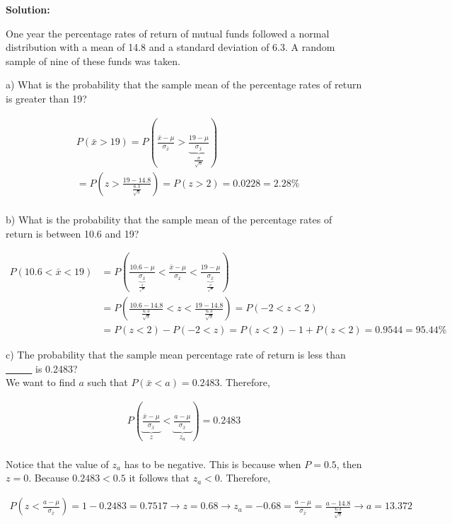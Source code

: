 \documentclass[12pt]{article}
\begin{document}
\begin{enumerate}
{\color{blue}
\noindent \textbf{Solution:}

One year the percentage rates of return of mutual funds followed a normal distribution with a mean of 14.8 and a standard deviation of 6.3. A random sample of nine of these funds was taken.

a) What is the probability that the sample mean of the percentage rates of return is greater than 19?

$$
\begin{aligned}
	& P(\bar{x}>19)=P(\frac{\bar{x}-\mu}{\sigma_{\bar{x}}}>\underbrace{\frac{19-\mu}{\sigma_{\bar{x}}}}_{\frac{\sigma}{\sqrt{n}}}) \\
	& =P\left(z>\frac{19-14.8}{\frac{6.3}{\sqrt{9}}}\right)=P(z>2)=0.0228=2.28 \% \\
	&
\end{aligned}
$$

	
b) What is the probability that the sample mean of the percentage rates of return is between 10.6 and 19?

$$
\begin{aligned}
	P(10.6<\bar{x}<19) & =P\left(\frac{10.6-\mu}{\underbrace{\sigma_{\bar{x}}}_{\frac{\sigma}{\sqrt{n}}}}<\frac{\bar{x}-\mu}{\sigma_{\bar{x}}}<\frac{19-\mu}{\underbrace{\sigma_{\bar{x}}}_{\frac{\sigma}{\sqrt{n}}}}\right) \\
	& =P\left(\frac{10.6-14.8}{\frac{6.3}{\sqrt{9}}}<z<\frac{19-14.8}{\frac{6.3}{\sqrt{9}}}\right)=P(-2<z<2) \\
	& =P(z<2)-P(-2<z)=P(z<2)-1+P(z<2)=0.9544=95.44 \%
\end{aligned}
$$


c) The probability that the sample mean percentage rate of return is less than \underline{\,\,\,\,\,\,\,\,\,\,\,\,\,\,\,\,} is 0.2483?\\

We want to find $a$ such that $P(\bar{x}<a)=0.2483$. Therefore,

$$
\begin{array}{r}
	P(\underbrace{\frac{\bar{x}-\mu}{\sigma_{\bar{x}}}}_z<\underbrace{\frac{a-\mu}{\sigma_{\bar{x}}}}_{z_a})=0.2483 \\
\end{array}
$$	

Notice that the value of $z_a$ has to be negative. This is because when $P=0.5$, then $z=0$. Because $0.2483<0.5$ it follows that $z_a<0$. Therefore,
	
$$
\begin{array}{r}	
	P\left(z<\frac{a-\mu}{\sigma_{\bar{x}}}\right)=1-0.2483=0.7517 \rightarrow z=0.68 \rightarrow z_a=-0.68=\frac{a-\mu}{\sigma_{\bar{x}}}=\frac{a-14.8}{\frac{6.3}{\sqrt{9}}} \rightarrow a=13.372
\end{array}
$$




}
\end{enumerate}
\end{document}
